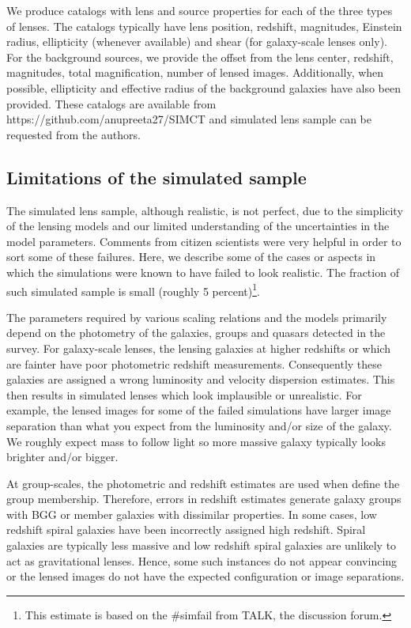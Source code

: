 \documentclass[useAMS,usenatbib,a4paper]{mn2e}
\begin{document}
We produce catalogs with lens and source properties for each of the
three types of lenses.  The catalogs typically have lens position,
redshift, magnitudes, Einstein radius, ellipticity (whenever available)
and shear (for galaxy-scale lenses only). For the background sources, we
provide the offset from the lens center, redshift, magnitudes, total
magnification, number of lensed images. Additionally, when possible,
ellipticity and effective radius of the background galaxies have also
been provided. These catalogs are available from
https://github.com/anupreeta27/SIMCT and simulated lens sample can be
requested from the authors. 


\subsection{Limitations of the simulated sample}
The simulated lens sample, although realistic, is not perfect, due to
the simplicity of the lensing models and our limited understanding of
the uncertainties in the model parameters. Comments from citizen
scientists were very helpful in order to sort some of these failures.
Here, we describe some of the cases or aspects in which the simulations
were known to have failed to look realistic. The fraction of such
simulated sample is small (roughly 5 percent)\footnote{This estimate is
based on the \#simfail from TALK, the discussion forum.}.

The parameters required by various scaling relations and the models
primarily depend on the photometry of the galaxies, groups and quasars
detected in the survey. For galaxy-scale lenses, the lensing galaxies at
higher redshifts or which are fainter have poor photometric redshift
measurements. Consequently these galaxies are assigned a wrong
luminosity and velocity dispersion estimates. This then results in
simulated lenses which look implausible or unrealistic.  For example,
the lensed images for some of the failed simulations have larger image
separation than what you expect from the luminosity and/or size of the
galaxy. We roughly expect mass to follow light so more massive galaxy
typically looks brighter and/or bigger.

At group-scales, the photometric and redshift estimates are used when define
the group membership. Therefore, errors in redshift estimates generate galaxy
groups with BGG or member galaxies with dissimilar properties. In some cases,
low redshift spiral galaxies have been incorrectly assigned high redshift.
Spiral galaxies are typically less massive and low redshift spiral galaxies are
unlikely to act as gravitational lenses. Hence, some such instances
do not appear convincing or the lensed images do not have the expected
configuration or image separations.
\end{document}
